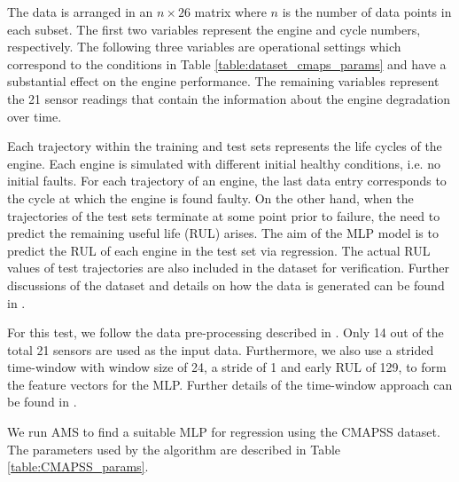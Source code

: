\documentclass[12pt]{elsart}%
\begin{document}
The data is arranged in an $n\times26$ matrix where $n$ is the number of data points in each subset. The first two variables represent the engine and cycle numbers, respectively. The following three variables are operational settings which correspond to the conditions in Table \ref{table:dataset_cmaps_params} and have a substantial effect on the engine performance. The remaining variables represent the 21 sensor readings that contain the information about the engine degradation over time.

\begin{table}[!htb]
\begin{center}
\end{center}
\caption{CMAPSS dataset details.}
\label{table:dataset_cmaps_params}
\end{table}

Each trajectory within the training and test sets represents the life cycles of the engine. Each engine is simulated with different initial healthy conditions, i.e. no initial faults. For each trajectory of an engine, the last data entry corresponds to the cycle at which the engine is found faulty. On the other hand, when the trajectories of the test sets terminate at some point prior to failure, the need to predict the remaining useful life (RUL) arises. The aim of the MLP model is to predict the RUL of each engine in the test set via regression. The actual RUL values of test trajectories are also included in the dataset for verification. Further discussions of the dataset and details on how the data is generated can be found in \cite{Saxena2008}.

For this test, we follow the data pre-processing described in \cite{Laredo2018}. Only 14 out of the total 21 sensors are used as the input data. Furthermore, we also use a strided time-window with window size of 24, a stride of 1 and early RUL of 129, to form the feature vectors for the MLP. Further details of the time-window approach can be found in \cite{Laredo2018,Li2018}.

We run AMS to find a suitable MLP for regression using the CMAPSS dataset. The parameters used by the algorithm are described in Table \ref{table:CMAPSS_params}.
\end{document}
